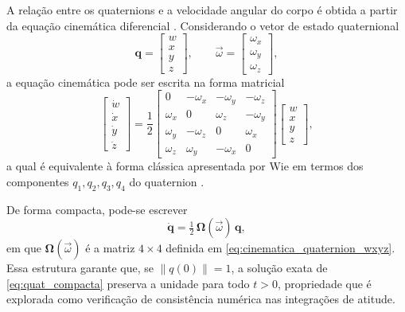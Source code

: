 A relação entre os quaternions e a velocidade angular do corpo é obtida a partir da equação cinemática diferencial \cite{wie2008space}. Considerando o vetor de estado quaternional
\begin{equation}
\mathbf{q} =
\begin{bmatrix}
w \\ x \\ y \\ z
\end{bmatrix},
\qquad
\vec{\omega} =
\begin{bmatrix}
\omega_x \\ \omega_y \\ \omega_z
\end{bmatrix},
\label{eq:q_omega_vetores}
\end{equation}
a equação cinemática pode ser escrita na forma matricial
\begin{equation}
\begin{bmatrix}
\dot{w} \\[2pt]
\dot{x} \\[2pt]
\dot{y} \\[2pt]
\dot{z}
\end{bmatrix}
=
\frac{1}{2}
\begin{bmatrix}
0 & -\omega_x & -\omega_y & -\omega_z \\
\omega_x & 0 & \omega_z & -\omega_y \\
\omega_y & -\omega_z & 0 & \omega_x \\
\omega_z & \omega_y & -\omega_x & 0
\end{bmatrix}
\begin{bmatrix}
w \\ x \\ y \\ z
\end{bmatrix},
\label{eq:cinematica_quaternion_wxyz}
\end{equation}
a qual é equivalente à forma clássica apresentada por Wie em termos dos componentes $q_1,q_2,q_3,q_4$ do quaternion \cite{wie2008space}.

De forma compacta, pode-se escrever
\begin{equation}
\dot{\mathbf{q}} = \tfrac{1}{2}\,\boldsymbol{\Omega}(\vec{\omega})\,\mathbf{q},
\label{eq:quat_compacta}
\end{equation}
em que $\boldsymbol{\Omega}(\vec{\omega})$ é a matriz $4\times 4$ definida em \eqref{eq:cinematica_quaternion_wxyz}. Essa estrutura garante que, se $\|q(0)\|=1$, a solução exata de \eqref{eq:quat_compacta} preserva a unidade para todo $t>0$, propriedade que é explorada como verificação de consistência numérica nas integrações de atitude.

